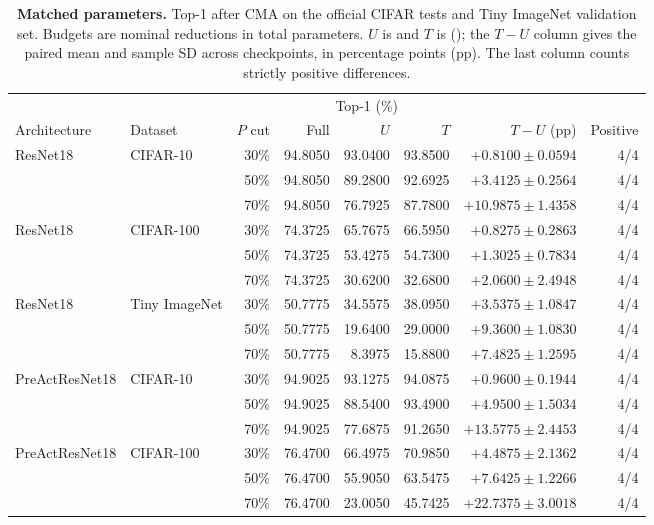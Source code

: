 \begin{table}[tbp]
\centering
\small
\setlength{\tabcolsep}{5pt}
\caption{\textbf{Matched parameters.} Top-1 after CMA on the official CIFAR tests and Tiny ImageNet validation set. Budgets are nominal reductions in total parameters. $U$ is \Uniform{} and $T$ is \TiltName{} (\Tilt{}); the $T-U$ column gives the paired mean and sample SD across checkpoints, in percentage points (pp). The last column counts strictly positive differences.}
\label{tab:tilt-uniform}
\begin{tabular}{@{}llrrrrrr@{}}
\toprule
 &  &  & \multicolumn{3}{c}{Top-1 (\%)} &  &  \\
\cmidrule(lr){4-6}
Architecture & Dataset & $P$ cut & Full & $U$ & $T$ & $T-U$ (pp) & Positive \\
\midrule
ResNet18 & CIFAR-10 & 30\% & 94.8050 & 93.0400 & 93.8500 & $+0.8100\pm 0.0594$ & 4/4 \\
 &  & 50\% & 94.8050 & 89.2800 & 92.6925 & $+3.4125\pm 0.2564$ & 4/4 \\
 &  & 70\% & 94.8050 & 76.7925 & 87.7800 & $+10.9875\pm 1.4358$ & 4/4 \\
\addlinespace[2pt]
ResNet18 & CIFAR-100 & 30\% & 74.3725 & 65.7675 & 66.5950 & $+0.8275\pm 0.2863$ & 4/4 \\
 &  & 50\% & 74.3725 & 53.4275 & 54.7300 & $+1.3025\pm 0.7834$ & 4/4 \\
 &  & 70\% & 74.3725 & 30.6200 & 32.6800 & $+2.0600\pm 2.4948$ & 4/4 \\
\addlinespace[2pt]
ResNet18 & Tiny ImageNet & 30\% & 50.7775 & 34.5575 & 38.0950 & $+3.5375\pm 1.0847$ & 4/4 \\
 &  & 50\% & 50.7775 & 19.6400 & 29.0000 & $+9.3600\pm 1.0830$ & 4/4 \\
 &  & 70\% & 50.7775 & 8.3975 & 15.8800 & $+7.4825\pm 1.2595$ & 4/4 \\
\addlinespace[2pt]
PreActResNet18 & CIFAR-10 & 30\% & 94.9025 & 93.1275 & 94.0875 & $+0.9600\pm 0.1944$ & 4/4 \\
 &  & 50\% & 94.9025 & 88.5400 & 93.4900 & $+4.9500\pm 1.5034$ & 4/4 \\
 &  & 70\% & 94.9025 & 77.6875 & 91.2650 & $+13.5775\pm 2.4453$ & 4/4 \\
\addlinespace[2pt]
PreActResNet18 & CIFAR-100 & 30\% & 76.4700 & 66.4975 & 70.9850 & $+4.4875\pm 2.1362$ & 4/4 \\
 &  & 50\% & 76.4700 & 55.9050 & 63.5475 & $+7.6425\pm 1.2266$ & 4/4 \\
 &  & 70\% & 76.4700 & 23.0050 & 45.7425 & $+22.7375\pm 3.0018$ & 4/4 \\
\bottomrule
\end{tabular}
\end{table}
